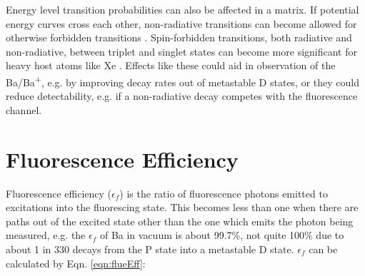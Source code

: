 

Energy level transition probabilities can also be affected in a matrix.  If potential energy curves cross each other, non-radiative transitions can become allowed for otherwise forbidden transitions \cite{crepin}.  Spin-forbidden transitions, both radiative and non-radiative, between triplet and singlet states can become more significant for heavy host atoms like Xe \cite{heavyAtom}.  Effects like these could aid in observation of the Ba/Ba\textsuperscript{+}, e.g. by improving decay rates out of metastable D states, or they could reduce detectability, e.g. if a non-radiative decay competes with the fluorescence channel.



\section{Fluorescence Efficiency}
\label{sec:fluorEff}

Fluorescence efficiency ($\epsilon_{f}$) is the ratio of fluorescence photons emitted to excitations into the fluorescing state.  This becomes less than one when there are paths out of the excited state other than the one which emits the photon being measured, e.g. the $\epsilon_{f}$ of Ba in vacuum is about 99.7\%, not quite 100\% due to about 1 in 330 decays from the P state into a metastable D state.  $\epsilon_{f}$ can be calculated by Eqn. \ref{eqn:flueEff}:

